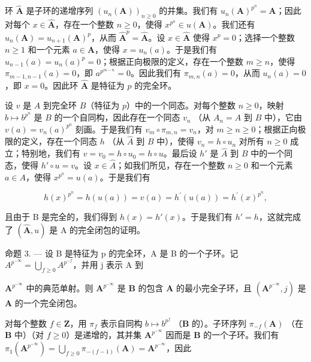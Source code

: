 环 \(\hat{\mathbf{A}}\) 是子环的递增序列 \((u_n(\mathbf{A}))_{n\geq 0}\) 的并集。我们有 \(u_{n}(\mathbf{A})^{p^{n}} = \mathbf{A}\)；因此对每个 \(x\in \hat{\mathbf{A}}\)，存在一个整数 \(n\geqslant 0\)，使得 \(x^{p^n}\in u(\mathbf{A})\)。我们还有 \(u_{n}(\mathbf{A}) = u_{n + 1}(\mathbf{A})^{p}\)，从而 \(\hat{\mathbf{A}}^p = \hat{\mathbf{A}}\)。设 \(x\in \hat{\mathbf{A}}\) 使得 \(x^{p} = 0\)；选择一个整数 \(n\geqslant 1\) 和一个元素 \(a\in \mathbf{A}\)，使得 \(x = u_{n}(a)\)。于是我们有 \(u_{n - 1}(a) = u_n(a)^p = 0\)；根据正向极限的定义，存在一个整数 \(m\geqslant n\)，使得 \(\pi_{m - 1,n - 1}(a) = 0\)，即 \(a^{p^{m - n}} = 0\)。因此我们有 \(\pi_{m,n}(a) = 0\)，从而 \(u_{n}(a) = 0\)，即 \(x = 0\)。因此环 \(\hat{\mathbf{A}}\) 是特征为 \(p\) 的完全环。

设 \(v\) 是 \(A\) 到完全环 \(B\)（特征为 \(p\)）中的一个同态。对每个整数 \(n \geqslant 0\)，映射 \(b \mapsto b^{p^n}\) 是 \(B\) 的一个自同构，因此存在一个同态 \(v_n\) （从 \(A_n = A\) 到 \(B\) 中），它由 \(v(a) = v_n(a)^{p^n}\) 刻画。于是我们有 \(v_m \circ \pi_{m,n} = v_n\)，对 \(m \geqslant n \geqslant 0\)；根据正向极限的定义，存在一个同态 \(h\) （从 \(\hat{A}\) 到 \(B\) 中），使得 \(v_n = h \circ u_n\) 对所有 \(n \geqslant 0\) 成立；特别地，我们有 \(v = v_0 = h \circ u_0 = h \circ u\)。最后设 \(h'\) 是 \(\hat{A}\) 到 \(B\) 中的一个同态，使得 \(h' \circ u = v\)。设 \(x \in \hat{A}\)；如我们所见，存在一个整数 \(n \geqslant 0\) 和一个元素 \(a \in A\)，使得 \(x^{p^n} = u(a)\)。于是我们有

\[
h (x) ^ {p ^ {n}} = h (u (a)) = v (a) = h ^ {\prime} (u (a)) = h ^ {\prime} (x) ^ {p ^ {n}},
\]

且由于 B 是完全的，我们得到 \(h(x) = h'(x)\)。于是我们有 \(h' = h\)，这就完成了 \((\hat{\mathbf{A}}, u)\) 是 A 的完全闭包的证明。

命题 3. --- 设 B 是特征为 p 的完全环，A 是 B 的一个子环。记 \(A^{p^{-\infty}} = \bigcup_{f \geqslant 0} A^{p^{-f}}\)，并用 j 表示 A 到

\(\mathbf{A}^{p^{-\infty}}\) 中的典范单射。则 \(\mathbf{A}^{p^{-\infty}}\) 是 \(\mathbf{B}\) 的包含 \(\mathbf{A}\) 的最小完全子环，且 \((\mathbf{A}^{p^{-\infty}}, j)\) 是 \(\mathbf{A}\) 的一个完全闭包。

对每个整数 \(f \in \mathbf{Z}\)，用 \(\pi_f\) 表示自同构 \(b \mapsto b^{p^f}\) （\(\mathbf{B}\) 的）。子环序列 \(\pi_{-f}(\mathbf{A})\) （在 \(\mathbf{B}\) 中）（对 \(f \geqslant 0\)）是递增的，其并集 \(\mathbf{A}^{p^{-\infty}}\) 因而是 \(\mathbf{B}\) 的一个子环。我们有 \(\pi_1(\mathbf{A}^{p^{-\infty}}) = \bigcup_{f \geqslant 0} \pi_{-(f-1)}(\mathbf{A}) = \mathbf{A}^{p^{-\infty}}\)，因此

